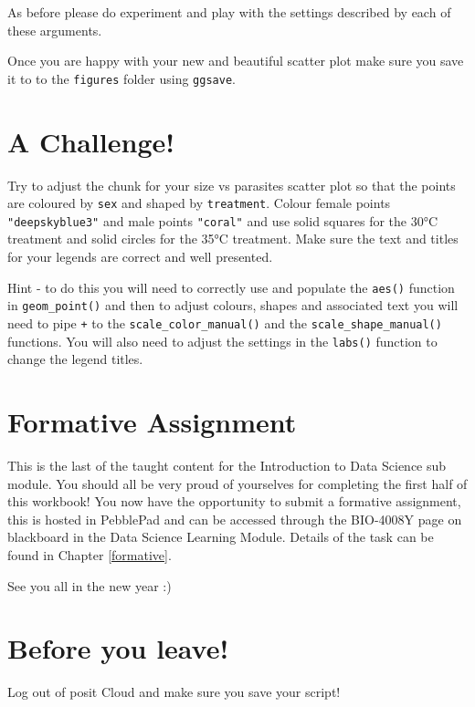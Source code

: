 \documentclass[
]{book}
\begin{document}
As before please do experiment and play with the settings described by each of these arguments.

Once you are happy with your new and beautiful scatter plot make sure you save it to to the \texttt{figures} folder using \texttt{ggsave}.

\hypertarget{a-challenge}{%
\section{A Challenge!}\label{a-challenge}}

Try to adjust the chunk for your size vs parasites scatter plot so that the points are coloured by \texttt{sex} and shaped by \texttt{treatment}. Colour female points \texttt{"deepskyblue3"} and male points \texttt{"coral"} and use solid squares for the 30°C treatment and solid circles for the 35°C treatment. Make sure the text and titles for your legends are correct and well presented.

Hint - to do this you will need to correctly use and populate the \texttt{aes()} function in \texttt{geom\_point()} and then to adjust colours, shapes and associated text you will need to pipe \texttt{+} to the \texttt{scale\_color\_manual()} and the \texttt{scale\_shape\_manual()} functions. You will also need to adjust the settings in the \texttt{labs()} function to change the legend titles.

\hypertarget{formative-assignment}{%
\section{Formative Assignment}\label{formative-assignment}}

This is the last of the taught content for the Introduction to Data Science sub module. You should all be very proud of yourselves for completing the first half of this workbook! You now have the opportunity to submit a formative assignment, this is hosted in PebblePad and can be accessed through the BIO-4008Y page on blackboard in the Data Science Learning Module. Details of the task can be found in Chapter \ref{formative}.

See you all in the new year :)

\hypertarget{before-you-leave-6}{%
\section{Before you leave!}\label{before-you-leave-6}}

Log out of posit Cloud and make sure you save your script!
\end{document}
